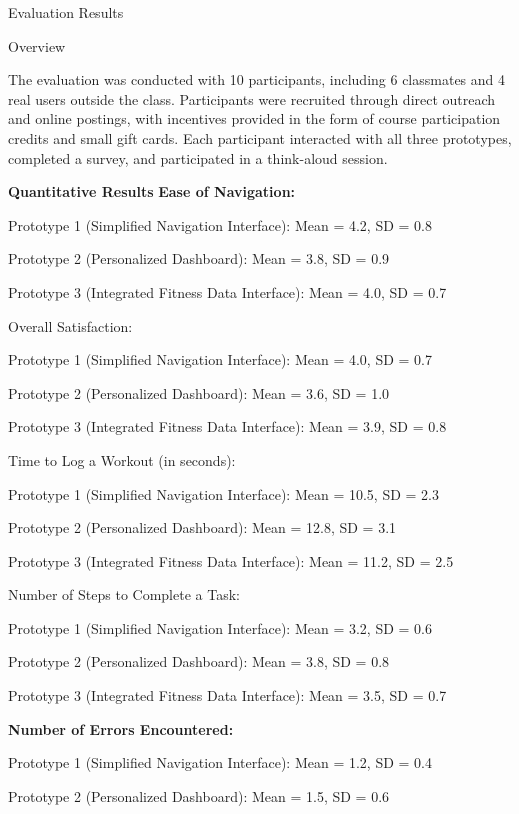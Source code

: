 \documentclass[
	letterpaper, %
]{jdf}
\begin{document}
Evaluation Results

Overview

The evaluation was conducted with 10 participants, including 6 classmates and 4 real users outside the class. Participants were recruited through direct outreach and online postings, with incentives provided in the form of course participation credits and small gift cards. Each participant interacted with all three prototypes, completed a survey, and participated in a think-aloud session.

 

\textbf{Quantitative Results
}
\textbf{Ease of Navigation:
}
 

Prototype 1 (Simplified Navigation Interface): Mean = 4.2, SD = 0.8

Prototype 2 (Personalized Dashboard): Mean = 3.8, SD = 0.9

Prototype 3 (Integrated Fitness Data Interface): Mean = 4.0, SD = 0.7

Overall Satisfaction:

 

Prototype 1 (Simplified Navigation Interface): Mean = 4.0, SD = 0.7

Prototype 2 (Personalized Dashboard): Mean = 3.6, SD = 1.0

Prototype 3 (Integrated Fitness Data Interface): Mean = 3.9, SD = 0.8

Time to Log a Workout (in seconds):

 

Prototype 1 (Simplified Navigation Interface): Mean = 10.5, SD = 2.3

Prototype 2 (Personalized Dashboard): Mean = 12.8, SD = 3.1

Prototype 3 (Integrated Fitness Data Interface): Mean = 11.2, SD = 2.5

Number of Steps to Complete a Task:

 

Prototype 1 (Simplified Navigation Interface): Mean = 3.2, SD = 0.6

Prototype 2 (Personalized Dashboard): Mean = 3.8, SD = 0.8

Prototype 3 (Integrated Fitness Data Interface): Mean = 3.5, SD = 0.7

\textbf{Number of Errors Encountered:
}
 

Prototype 1 (Simplified Navigation Interface): Mean = 1.2, SD = 0.4

Prototype 2 (Personalized Dashboard): Mean = 1.5, SD = 0.6
\end{document}
